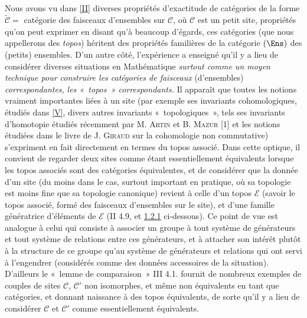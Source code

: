 \documentclass[10pt]{../fichiers-configuration-latex/smfart}
\begin{document}
\subsection{}
Nous avons vu dans \ref{II} diverses propriétés d'exactitude de
catégories
de la forme $\widetilde{𝒞}=$ catégorie des faisceaux
d'ensembles sur $𝒞$, où $𝒞$ est un petit site,
propriétés qu'on peut exprimer en disant qu'à beaucoup
d'égards, ces
catégories (que nous appellerons des \emph{topos}) héritent des
propriétés familières de la catégorie $(\Ens)$ des (petits)
ensembles. D'un autre côté, l'expérience a enseigné qu'il y a lieu
de considérer diverses situations en Mathématique \emph{surtout
comme un moyen technique pour construire
  les catégories de faisceaux} (d'ensembles) \emph{correspondantes,} \ie
\emph{les  « topos »  correspondants.} Il apparaît que toutes
les notions vraiment importantes liées à un site (par exemple
ses invariants cohomologiques, étudiés dans \ref{V}, divers autres
invariants « topologiques », tels ses invariants d'homotopie
étudiés récemment par M. \textsc{Artin} et B. \textsc{Mazur}
[1] et les notions étudiées dans le livre de J. \textsc{Giraud}
sur la cohomologie non commutative) s'expriment en fait directement
en termes du topos associé. Dans cette optique, il convient de
regarder deux sites comme étant essentiellement équivalents
lorsque les topos associés sont des catégories équivalentes,
et de considérer que la donnée d'un site (du moins dans le cas,
surtout important en pratique, où sa topologie est moins fine que
sa topologie canonique) revient à celle d'un topos $ℰ$
(savoir le topos associé, formé des faisceaux d'ensembles sur le
site), et d'une famille génératrice d'éléments de
$ℰ$ (\cf\pageoriginale II 4.9, et \hyperref[IV.cor1.2.1]{1.2.1}
ci-dessous). Ce point de vue est analogue à celui qui consiste à
associer un groupe à tout système de générateurs et tout
système de relations entre ces générateurs, et à attacher
son intérêt plutôt à la structure de ce groupe qu'au
système de générateurs et relations qui ont servi à
l'engendrer (considérés comme des données accessoires de la
situation). D'ailleurs le « lemme de comparaison »  III 4.1.
fournit de nombreux exemples de couples de sites $𝒞$,
$𝒞'$ non isomorphes, et même non équivalents en tant que
catégories, et donnant naissance à des topos équivalents, de
sorte qu'il y a lieu de considérer $𝒞$ et $𝒞'$
comme essentiellement équivalents.
\end{document}
